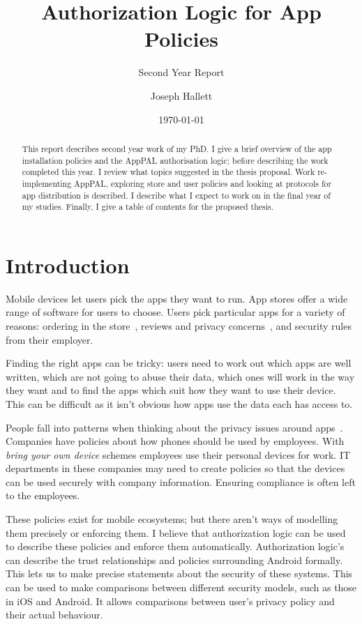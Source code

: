 \documentclass[a4paper]{scrartcl}
\title{Authorization Logic for App Policies}
\subtitle{Second Year Report}
\author{Joseph Hallett}
\date\today
\begin{document}
\maketitle

\begin{abstract}
  This report describes second year work of my PhD.
  I give a brief overview of the app installation policies and the AppPAL authorisation logic; before describing the work completed this year.
  I review what topics suggested in the thesis proposal.
  Work re-implementing AppPAL, exploring store and user policies and looking at protocols for app distribution is described.
  I describe what I expect to work on in the final year of my studies.
  Finally, I give a table of contents for the proposed thesis.
\end{abstract}

\section{Introduction}

Mobile devices let users pick the apps they want to run.
App stores offer a wide range of software for users to choose.
Users pick particular apps for a variety of reasons:
  ordering in the store~\citep{Prata:2012in},
  reviews and privacy concerns~\citep{Kelley:2013kc},
  and security rules from their employer.

Finding the right apps can be tricky:
  users need to work out which apps are well written, which are not going to abuse their data, which ones will work in the way they want
  and to find the apps which suit how they want to use their device.
This can be difficult as it isn't obvious how apps use the data each has access to.

People fall into patterns when thinking about the privacy issues around apps~\citep{Sadeh:2014vq}.
Companies have policies about how phones should be used by employees.
With \emph{bring your own device} schemes employees use their personal devices for work.
IT departments in these companies may need to create policies so that the devices can be used securely with company information.
Ensuring compliance is often left to the employees.

These policies exist for mobile ecosystems; but there aren't ways of modelling them precisely or enforcing them.
I believe that authorization logic can be used to describe these policies and enforce them automatically.
Authorization logic's can describe the trust relationships and policies surrounding Android formally.
This lets us to make precise statements about the security of these systems.
This can be used to make comparisons between different security models, such as those in iOS and Android.
It allows comparisons between user's privacy policy and their actual behaviour.
\end{document}
